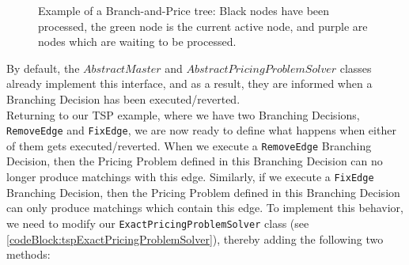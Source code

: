 \documentclass[a4paper]{article}
\newcommand{\code}[1]{\lstinline[language=java, style=seminar]!#1!}
\begin{document}
\begin{figure}[width=5cm]
\centering
{}
\caption{Example of a Branch-and-Price tree: Black nodes have been processed, the green node is the current active node, and purple are nodes which are waiting to be processed.}
\label{fig:bap_tree}
\end{figure}

By default, the $AbstractMaster$ and $AbstractPricingProblemSolver$ classes already implement this interface, and as a result, they are informed when a Branching Decision has been executed/reverted.\\
Returning to our TSP example, where we have two Branching Decisions, \code{RemoveEdge} and \code{FixEdge}, we are now ready to define what happens when either of them gets executed/reverted. When we execute a \code{RemoveEdge} Branching Decision, then the Pricing Problem defined in this Branching Decision can no longer produce matchings with this edge. Similarly, if we execute a \code{FixEdge} Branching Decision, then the Pricing Problem defined in this Branching Decision can only produce matchings which contain this edge. To implement this behavior, we need to modify our \code{ExactPricingProblemSolver} class (see \ref{codeBlock:tspExactPricingProblemSolver}), thereby adding the following two methods:
\end{document}

